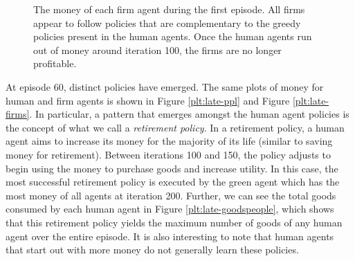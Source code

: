 \documentclass[twoside,twocolumn]{article}
\begin{document}
\begin{figure}[h]
  \caption{The money of each firm agent during the first episode. All firms appear to follow policies that are complementary to the greedy policies present in the human agents. Once the human agents run out of money around iteration 100, the firms are no longer profitable.}
  \label{plt:init-firms}
\end{figure}

\medskip
At episode 60, distinct policies have emerged. The same plots of money for human and firm agents is shown in Figure \ref{plt:late-ppl} and Figure \ref{plt:late-firms}. In particular, a pattern that emerges amongst the human agent policies is the concept of what we call a \textit{retirement policy}. In a retirement policy, a human agent aims to increase its money for the majority of its life (similar to saving money for retirement). Between iterations 100 and 150, the policy adjusts to begin using the money to purchase goods and increase utility. In this case, the most successful retirement policy is executed by the green agent which has the most money of all agents at iteration 200. Further, we can see the total goods consumed by each human agent in Figure \ref{plt:late-goodspeople}, which shows that this retirement policy yields the maximum number of goods of any human agent over the entire episode. It is also interesting to note that human agents that start out with more money do not generally learn these policies.
\end{document}
